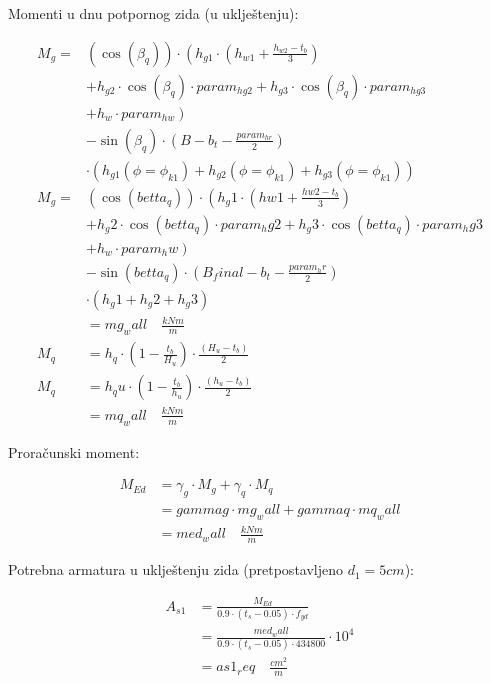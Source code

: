 \documentclass[a4paper, 11pt]{article}
\begin{document}
Momenti u dnu potpornog zida (u uklje\v{s}tenju):

\begin{align*}
M_{g} = & \left( \cos(\beta_q)\right) \cdot \left( h_{g1} \cdot \left(h_{w1} + \frac{h_{w2} - t_{b}}{3}\right) \right. \\
    & \left. + h_{g2} \cdot \cos(\beta_q) \cdot param_{hg2} + h_{g3} \cdot \cos(\beta_q) \cdot param_{hg3} \right. \\
    & \left. + h_{w} \cdot param_{hw}\right) \\
    & - \sin(\beta_q) \cdot \left(B - b_{t} - \frac{param_{hr}}{2}\right) \\
    & \cdot \left( h_{g1}(\phi = \phi_{k1}) + h_{g2}(\phi = \phi_{k1}) + h_{g3}(\phi = \phi_{k1}) \right)\\
M_{g} = & \left( \cos(betta_q)\right) \cdot \left( h_g1 \cdot \left(hw1 + \frac{hw2 - t_b}{3}\right) \right. \\
    & \left. + h_g2 \cdot \cos(betta_q) \cdot param_hg2 + h_g3 \cdot \cos(betta_q) \cdot param_hg3 \right. \\
    & \left. + h_w \cdot param_hw\right) \\
    & - \sin(betta_q) \cdot \left(B_final - b_t - \frac{param_hr}{2}\right) \\
    & \cdot \left( h_g1 + h_g2 + h_g3 \right)\\
    &= mg_wall \quad \frac{kNm}{m} \\
M_{q} &= h_{q} \cdot \left(1 - \frac{t_{b}}{H_{u}}\right) \cdot \frac{\left(H_{u} - t_{b}\right)}{2}\\
M_{q} &= h_qu \cdot \left(1 - \frac{t_b}{h_u}\right) \cdot \frac{\left(h_u - t_b\right)}{2} \\
      &= mq_wall \quad \frac{kNm}{m}
\end{align*}

Prora\v{c}unski moment:

\begin{align*}
M_{Ed} &= \gamma_{g} \cdot M_{g} + \gamma_{q} \cdot M_q \\
	   &= gammag \cdot mg_wall + gammaq \cdot mq_wall \\
	   &= med_wall \quad \frac{kNm}{m}
\end{align*}

Potrebna armatura u uklje\v{s}tenju zida (pretpostavljeno $d_{1}=5cm$):

\begin{align*}
A_{s1} &= \frac{M_{Ed}}{0.9 \cdot (t_{s} - 0.05) \cdot f_{yd}}\\
	   &= \frac{med_wall}{0.9 \cdot (t_s - 0.05) \cdot 434800} \cdot 10^{4} \\
	   &= as1_req \quad \frac{cm^2}{m}
\end{align*}
\end{document}
